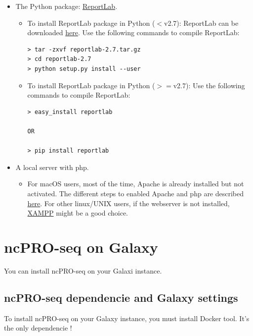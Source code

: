 \documentclass[12pt]{article}
\begin{document}
\begin{itemize}
 \item The Python package: \href{http://www.reportlab.com/opensource/}{ ReportLab}.

\begin{itemize}
 \item To install ReportLab package in Python ($<$v2.7): ReportLab can be downloaded \href{https://pypi.python.org/packages/source/r/reportlab/reportlab-2.7.tar.gz}{ here}. Use the following commands to compile ReportLab:
\begin{verbatim}
> tar -zxvf reportlab-2.7.tar.gz
> cd reportlab-2.7
> python setup.py install --user
\end{verbatim}
 \item To install ReportLab package in Python ($>=$v2.7): Use the following commands to compile ReportLab:
\begin{verbatim}
> easy_install reportlab

OR

> pip install reportlab
\end{verbatim}
\end{itemize}

 \item A local server with php.

\begin{itemize}
 \item For macOS users, most of the time, Apache is already installed but not activated. The different steps to enabled Apache and php are described \href{http://www.procata.com/blog/archives/2007/10/28/working-with-php-5-in-mac-os-x-105}{ here}. For other linux/UNIX users, if the webserver is not installed, \href{http://www.apachefriends.org/en/xampp.html}{ XAMPP} might be a good choice.
\end{itemize}

\end{itemize}

\section{ncPRO-seq on Galaxy}
\label{subsection:additional}

You can install ncPRO-seq on your Galaxi instance. 

\subsection{ncPRO-seq dependencie and Galaxy settings}

To install ncPRO-seq on your Galaxy instance, you must install Docker tool. It's the only dependencie !
\end{document}
